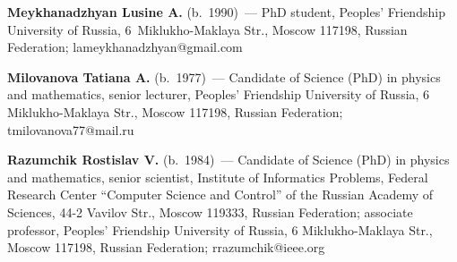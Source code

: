 

\Contr

\noindent
\textbf{Meykhanadzhyan Lusine A.} (b.\ 1990)~---
PhD student, Peoples' Friendship University of Russia, 6~Miklukho-Maklaya Str., Moscow 117198, Russian Federation; lameykhanadzhyan@gmail.com

\vspace*{3pt}

\noindent
\textbf{Milovanova Tatiana A.} (b.\ 1977)~---
Candidate of Science (PhD) in physics and mathematics, senior lecturer, Peoples' Friendship University of Russia, 6 Miklukho-Maklaya Str., Moscow 117198, Russian Federation; tmilovanova77@mail.ru

\vspace*{3pt}

\noindent
\textbf{Razumchik Rostislav V.} (b.\ 1984)~---
Candidate of Science (PhD) in physics and mathematics, senior scientist, Institute of Informatics Problems, Federal Research Center ``Computer Science and Control'' of the Russian Academy of Sciences, 44-2 Vavilov Str., Moscow 119333, Russian Federation; associate professor, Peoples' Friendship University of Russia, 6 Miklukho-Maklaya Str., Moscow
117198, Russian Federation; rrazumchik@ieee.org

\label{end\stat}


\renewcommand{\bibname}{\protect\rm Литература} 